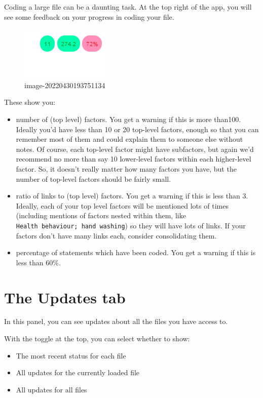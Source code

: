 \documentclass[
]{book}
\providecommand{\tightlist}{%
  \setlength{\itemsep}{0pt}\setlength{\parskip}{0pt}}
\begin{document}
Coding a large file can be a daunting task. At the top right of the app, you will see some feedback on your progress in coding your file.

\begin{figure}
\centering
\includegraphics{_assets/image-20220430193751134.png}
\caption{image-20220430193751134}
\end{figure}

These show you:

\begin{itemize}
\tightlist
\item
  number of (top level) factors. You get a warning if this is more than100. Ideally you'd have less than 10 or 20 top-level factors, enough so that you can remember most of them and could explain them to someone else without notes. Of course, each top-level factor might have subfactors, but again we'd recommend no more than say 10 lower-level factors within each higher-level factor. So, it doesn't really matter how many factors you have, but the number of top-level factors should be fairly small.
\item
  ratio of links to (top level) factors. You get a warning if this is less than 3. Ideally, each of your top level factors will be mentioned lots of times (including mentions of factors nested within them, like \texttt{Health\ behaviour;\ hand\ washing}) so they will have lots of links. If your factors don't have many links each, consider consolidating them.
\item
  percentage of statements which have been coded. You get a warning if this is less than 60\%.
\end{itemize}

\hypertarget{xupdates-tab}{%
\chapter{The Updates tab}\label{xupdates-tab}}

In this panel, you can see updates about all the files you have access to.

With the toggle at the top, you can select whether to show:

\begin{itemize}
\tightlist
\item
  The most recent status for each file
\item
  All updates for the currently loaded file
\item
  All updates for all files
\end{itemize}
\end{document}
